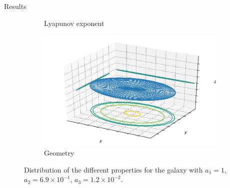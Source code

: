\documentclass{beamer}
\begin{document}
\begin{frame}{Results}
\begin{figure}[h]
\begin{subfigure}[t]{0.35\textwidth}
			\caption{Lyapunov exponent}
		\end{subfigure}
		\begin{subfigure}[t]{0.35\textwidth}
			\includegraphics[width=\textwidth]{"../Files/Week 13/images/3_ellipsoid"}
			\caption{Geometry}
		\end{subfigure}
		\caption{Distribution of the different properties for the galaxy with $a_1 = 1$, $a_2 = 6.9\times10^{-1}$, $a_3 = 1.2\times10^{-2}$.}
	\end{figure}
\end{frame}
\end{document}
